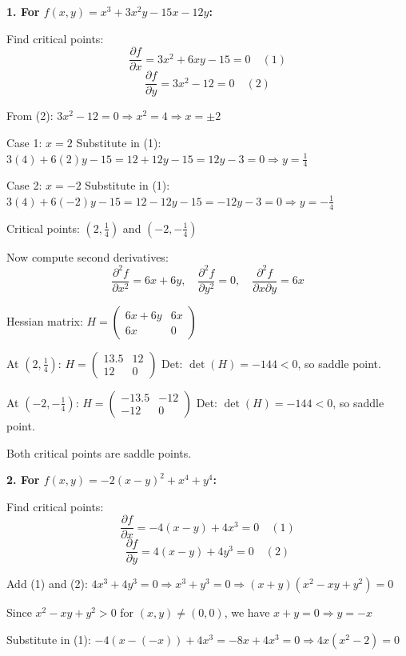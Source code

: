 \documentclass[12pt]{article}
\begin{document}
\begin{correctionbox}
\textbf{1. For $f(x, y) = x^3 + 3x^2y - 15x - 12y$:}

Find critical points:
$$\frac{\partial f}{\partial x} = 3x^2 + 6xy - 15 = 0 \quad (1)$$
$$\frac{\partial f}{\partial y} = 3x^2 - 12 = 0 \quad (2)$$

From (2): $3x^2 - 12 = 0 \Rightarrow x^2 = 4 \Rightarrow x = \pm 2$

Case 1: $x = 2$
Substitute in (1): $3(4) + 6(2)y - 15 = 12 + 12y - 15 = 12y - 3 = 0 \Rightarrow y = \frac{1}{4}$

Case 2: $x = -2$
Substitute in (1): $3(4) + 6(-2)y - 15 = 12 - 12y - 15 = -12y - 3 = 0 \Rightarrow y = -\frac{1}{4}$

Critical points: $(2, \frac{1}{4})$ and $(-2, -\frac{1}{4})$

Now compute second derivatives:
$$\frac{\partial^2 f}{\partial x^2} = 6x + 6y, \quad \frac{\partial^2 f}{\partial y^2} = 0, \quad \frac{\partial^2 f}{\partial x \partial y} = 6x$$

Hessian matrix: $H = \begin{pmatrix} 6x + 6y & 6x \\ 6x & 0 \end{pmatrix}$

At $(2, \frac{1}{4})$: $H = \begin{pmatrix} 13.5 & 12 \\ 12 & 0 \end{pmatrix}$
Det: $\det(H) = -144 < 0$, so saddle point.

At $(-2, -\frac{1}{4})$: $H  = \begin{pmatrix} -13.5 & -12 \\ -12 & 0 \end{pmatrix}$
Det: $\det(H) = -144 < 0$, so saddle point.

Both critical points are saddle points.

\textbf{2. For $f(x, y) = -2(x - y)^2 + x^4 + y^4$:}

Find critical points:
$$\frac{\partial f}{\partial x} = -4(x - y) + 4x^3 = 0 \quad (1)$$
$$\frac{\partial f}{\partial y} = 4(x - y) + 4y^3 = 0 \quad (2)$$

Add (1) and (2): $4x^3 + 4y^3 = 0 \Rightarrow x^3 + y^3 = 0 \Rightarrow (x + y)(x^2 - xy + y^2) = 0$

Since $x^2 - xy + y^2 > 0$ for $(x,y) \neq (0,0)$, we have $x + y = 0 \Rightarrow y = -x$

Substitute in (1): $-4(x - (-x)) + 4x^3 = -8x + 4x^3 = 0 \Rightarrow 4x(x^2 - 2) = 0$


\end{correctionbox}
\end{document}
